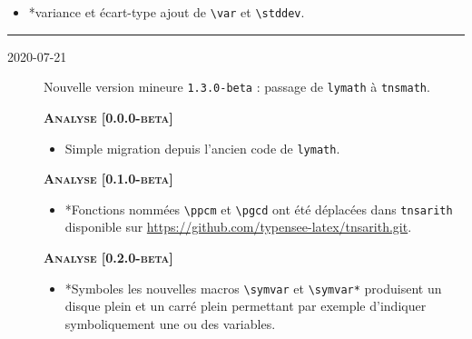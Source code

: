 \documentclass[12pt,a4paper]{book}
\makeatletter
\newcommand\env[1]{\texttt{#1}}
\newcommand\macro[1]{\env{\textbackslash{}#1}}
\theoremstyle{definition}
\newcommand\separation{
	\medskip
	\hfill\rule{0.5\textwidth}{0.75pt}\hfill
	\medskip
}
\newcommand\topic{\@ifstar{\@topic@star}{\@topic@no@star}}
\newcommand\@topic@no@star[1]{%
	\textbf{\textsc{#1}.}%
}
\newcommand\@topic@star[1]{%
	\textbf{\textsc{#1} :}%
}
\makeatother
\begin{document}
{{\begin{description}
\begin{itemize}[itemsep=.5em]
    
        
    
        \item \topic*{variance et écart-type}
              ajout de \macro{var} et \macro{stddev}.
    
    
        
    
    \end{itemize}
    
    
    \separation
\end{description}

\begin{description}    \item[2020-07-21] Nouvelle version mineure \verb+1.3.0-beta+ : passage de \verb#lymath# à \verb#tnsmath#.
    
    
    
    
    \begin{center}
        \textbf{\textsc{Analyse [0.0.0-beta]}}
    \end{center}
    
    \begin{itemize}[itemsep=.5em]
        \item Simple migration depuis l'ancien code de \verb+lymath+.
    \end{itemize}
    
    
    \begin{center}
        \textbf{\textsc{Analyse [0.1.0-beta]}}
    \end{center}
    
    \begin{itemize}[itemsep=.5em]
        \item \topic*{Fonctions nommées} \macro{ppcm} et \macro{pgcd} ont été déplacées dans \texttt{tnsarith} disponible sur \url{https://github.com/typensee-latex/tnsarith.git}.
    \end{itemize}
    
    
    \begin{center}
        \textbf{\textsc{Analyse [0.2.0-beta]}}
    \end{center}
    
    \begin{itemize}[itemsep=.5em]
        \item \topic*{Symboles} les nouvelles macros \macro{symvar} et \macro{symvar*} produisent un disque plein et un carré plein permettant par exemple d'indiquer symboliquement une ou des variables.
        

\end{itemize}
\end{description}}}
\end{document}
